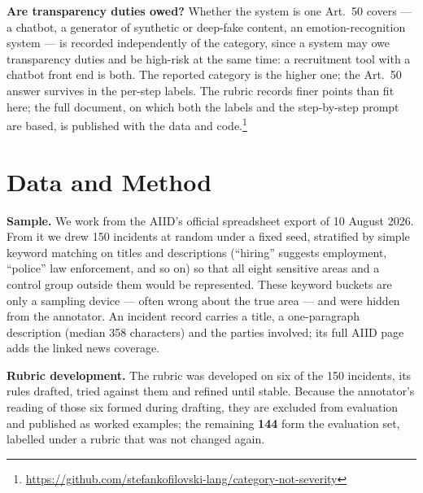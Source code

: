\documentclass[sigconf,natbib=false, language=english]{acmart}
\begin{document}
\textbf{Are transparency duties owed?} Whether the system is one Art.~50 covers ---
a chatbot, a generator of synthetic or deep-fake content, an emotion-recognition
system --- is recorded independently of the category, since a system may owe
transparency duties and be high-risk at the same time: a recruitment tool with a
chatbot front end is both. The reported category is the higher one; the Art.~50
answer survives in the per-step labels. The rubric records finer points than fit
here; the full document, on which both the labels and the step-by-step prompt are
based, is published with the data and
code.\footnote{\url{https://github.com/stefankofilovski-lang/category-not-severity}}

\section{Data and Method}

\textbf{Sample.} We work from the AIID's official spreadsheet export of 10 August
2026. From it we drew 150 incidents at random under a fixed seed, stratified by simple keyword matching on titles and descriptions
(``hiring'' suggests employment, ``police'' law enforcement, and so on) so that all
eight sensitive areas and a control group outside them would be represented. These
keyword buckets are only a sampling device --- often wrong about the true area --- and
were hidden from the annotator. An incident record carries a title, a one-paragraph
description (median 358 characters) and the parties involved; its full AIID page adds
the linked news coverage.

\textbf{Rubric development.} The rubric was developed on six of the 150 incidents,
its rules drafted, tried against them and refined until stable. Because the
annotator's reading of those six formed during drafting, they are excluded from
evaluation and published as worked examples; the remaining \textbf{144} form the
evaluation set, labelled under a rubric that was not changed again.
\end{document}
